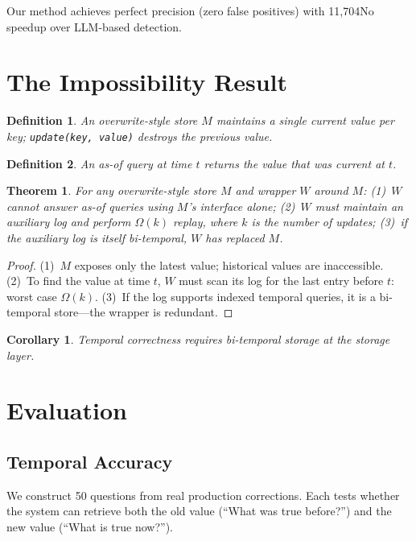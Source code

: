 \documentclass[sigconf]{acmart}
\newtheorem{theorem}{Theorem}
\newtheorem{definition}{Definition}
\newtheorem{corollary}{Corollary}
\begin{document}
Our method achieves perfect precision (zero false positives) with 11{,}704No speedup over LLM-based detection.

\section{The Impossibility Result}
\label{sec:theory}

\begin{definition}
An \emph{overwrite-style store} $M$ maintains a single current value per key; \texttt{update(key, value)} destroys the previous value.
\end{definition}

\begin{definition}
An \emph{as-of query} at time $t$ returns the value that was current at $t$.
\end{definition}

\begin{theorem}
\label{thm:impossible}
For any overwrite-style store $M$ and wrapper $W$ around $M$: (1)~$W$ cannot answer as-of queries using $M$'s interface alone; (2)~$W$ must maintain an auxiliary log and perform $\Omega(k)$ replay, where $k$ is the number of updates; (3)~if the auxiliary log is itself bi-temporal, $W$ has replaced $M$.
\end{theorem}

\begin{proof}
(1)~$M$ exposes only the latest value; historical values are inaccessible. (2)~To find the value at time $t$, $W$ must scan its log for the last entry before $t$: worst case $\Omega(k)$. (3)~If the log supports indexed temporal queries, it is a bi-temporal store---the wrapper is redundant.
\end{proof}

\begin{corollary}
Temporal correctness requires bi-temporal storage at the storage layer.
\end{corollary}

\section{Evaluation}
\label{sec:eval}

\subsection{Temporal Accuracy}

We construct 50 questions from real production corrections. Each tests whether the system can retrieve both the old value (``What was true before?'') and the new value (``What is true now?'').
\end{document}
